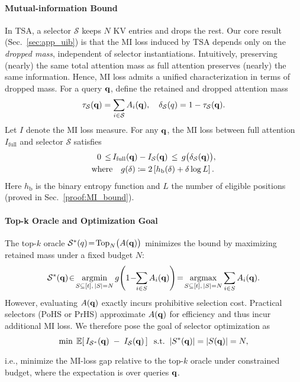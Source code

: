 \paragraph{Mutual-information Bound} In TSA, a selector $\mathcal S$ keeps $N$ KV entries and drops the rest. Our core result (Sec.~\ref{sec:app_uib}) is that the MI loss induced by TSA depends only on the \emph{dropped mass}, independent of selector instantiations. Intuitively, preserving (nearly) the same total attention mass as full attention preserves (nearly) the same information. Hence, MI loss admits a unified characterization in terms of dropped mass. For a query $\mathbf{q}$, define the retained and dropped attention mass
\begin{equation}
    \tau_{\mathcal S}(\mathbf{q})=\sum_{i\in\mathcal S}A_i(\mathbf{q}), \quad \delta_{\mathcal S}(q)=1-\tau_{\mathcal S}(\mathbf{q}).
\end{equation}
Let $I$ denote the MI loss measure. For any $\mathbf{q}$, the MI loss between full attention $I_{\mathrm{full}}$ and selector $\mathcal{S}$ satisfies
\begin{equation}
\label{eq:mi_bound}
\begin{aligned}
    0 \, \le \, & I_{\mathrm{full}}(\mathbf{q})-I_{\mathcal S}(\mathbf{q}) \, \le \, g\big(\delta_{\mathcal S}(\mathbf{q})\big), \\
    \text{where} &\quad g(\delta) \coloneqq 2\left[h_{\mathrm b}(\delta)+\delta\log L\right].
\end{aligned}
\end{equation}
Here $h_{\mathrm b}$ is the binary entropy function and $L$ the number of eligible positions (proved in Sec.~\ref{proof:MI_bound}). 

\paragraph{Top-k Oracle and Optimization Goal} The top-$k$ oracle $\mathcal S^{*}(q)\!=\!\operatorname*{Top}_N \!\big(A(\mathbf{q})\big)$ minimizes the bound by maximizing retained mass under a fixed budget $N$:
\begin{equation}
\begin{aligned}
\mathcal S^{*}(\bq)
\!\in\! \operatorname*{arg min}_{S\subseteq [t],\, |S|=N}
g\!\left(1\!-\!\!\sum_{i\in S} A_i(\bq)\right)
\!=\!
\operatorname*{arg max}_{S\subseteq [t],\, |S|=N}
\sum_{i\in S} A_i(\bq).
\end{aligned}
\end{equation}
However, evaluating $A(\mathbf{q})$ exactly incurs prohibitive selection cost. Practical selectors (PoHS or PrHS) approximate $A(\mathbf{q})$ for efficiency and thus incur additional MI loss. We therefore pose the goal of selector optimization as
\begin{equation}
\label{eq:selector_opt}
\min_{}\; %
\mathbb{E}\!\left[\, I_{\mathcal S^{*}}(\bq)\;-\;I_{\mathcal S}(\bq) \,\right]
\;\; \text{s.t.}\;\; |S^*(\bq)|=|S(\bq)|=N,
\end{equation}
i.e., minimize the MI-loss gap relative to the top-$k$ oracle under constrained budget, where the expectation is over queries $\mathbf{q}$.


